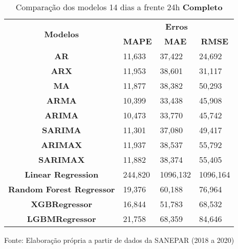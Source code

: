 \begin{table}[H]
	\centering
	\caption{Comparação dos modelos 14 dias a frente 24h \textbf{Completo} }\label{tb:30-24cm}
	\begin{tabular}{@{}clll@{}}
		\toprule
		\multirow{2}{*}{\textbf{Modelos}} & \multicolumn{3}{c}{\textbf{Erros}}                                                                       \\ \cmidrule(l){2-4} 
		& \multicolumn{1}{c}{\textbf{MAPE}} & \multicolumn{1}{c}{\textbf{MAE}} & \multicolumn{1}{c}{\textbf{RMSE}} \\ \hline
\textbf{AR}                       & 11,633                            & 37,422                           & 24,692                            \\
\textbf{ARX}                      & 11,953                            & 38,601                           & 31,117                            \\
\textbf{MA}                       & 11,877                            & 38,382                           & 50,293                            \\
\textbf{ARMA}                     & 10,399                            & 33,438                           & 45,908                            \\
\textbf{ARIMA}                    & 10,473                            & 33,770                           & 45,742                            \\
\textbf{SARIMA}                   & 11,301                            & 37,080                           & 49,417                            \\
\textbf{ARIMAX}                   & 11,937                            & 38,537                           & 55,792                            \\
\textbf{SARIMAX}                  & 11,882                            & 38,374                           & 55,405                            \\
\textbf{Linear Regression}        & 244,820                           & 1096,132                         & 1096,164                          \\
\textbf{Random Forest Regressor}  & 19,376                            & 60,188                           & 76,964                            \\
\textbf{XGBRegressor}             & 16,844                            & 51,783                           & 68,532                            \\
\textbf{LGBMRegressor}            & 21,758                            & 68,359                           & 84,646                            \\ \bottomrule
	\end{tabular}

Fonte: Elaboração própria a partir de dados da SANEPAR (2018 a 2020)
\end{table}


